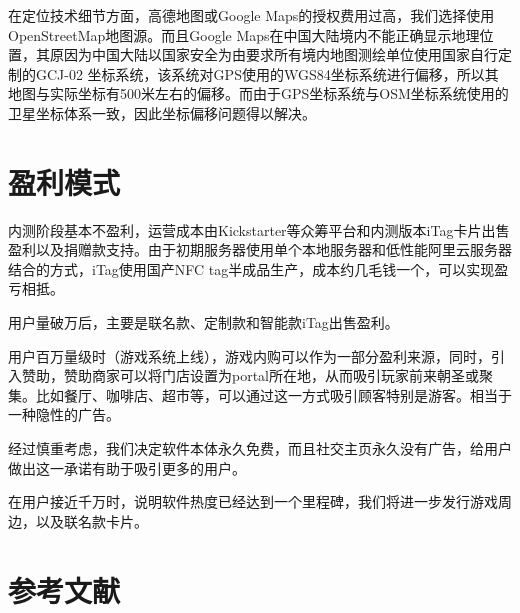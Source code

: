 \documentclass[UTF8]{ctexart}
\begin{document}
在定位技术细节方面，高德地图或Google Maps的授权费用过高，我们选择使用OpenStreetMap地图源。而且Google Maps在中国大陆境内不能正确显示地理位置，其原因为中国大陆以国家安全为由要求所有境内地图测绘单位使用国家自行定制的GCJ-02 坐标系统，该系统对GPS使用的WGS84坐标系统进行偏移，所以其地图与实际坐标有500米左右的偏移。而由于GPS坐标系统与OSM坐标系统使用的卫星坐标体系一致，因此坐标偏移问题得以解决。

\section{盈利模式}

内测阶段基本不盈利，运营成本由Kickstarter等众筹平台和内测版本iTag卡片出售盈利以及捐赠款支持。由于初期服务器使用单个本地服务器和低性能阿里云服务器结合的方式，iTag使用国产NFC tag半成品生产，成本约几毛钱一个，可以实现盈亏相抵。

用户量破万后，主要是联名款、定制款和智能款iTag出售盈利。

用户百万量级时（游戏系统上线），游戏内购可以作为一部分盈利来源，同时，引入赞助，赞助商家可以将门店设置为portal所在地，从而吸引玩家前来朝圣或聚集。比如餐厅、咖啡店、超市等，可以通过这一方式吸引顾客特别是游客。相当于一种隐性的广告。

经过慎重考虑，我们决定软件本体永久免费，而且社交主页永久没有广告，给用户做出这一承诺有助于吸引更多的用户。

在用户接近千万时，说明软件热度已经达到一个里程碑，我们将进一步发行游戏周边，以及联名款卡片。

\section{参考文献}





\end{document}
